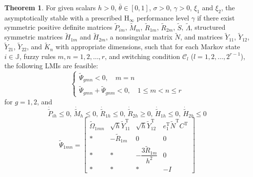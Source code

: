 \documentclass[preprint,review,fleqn,sort&compress,3p]{elsarticle}
\theoremstyle{definition} %
\theoremstyle{definition}%
\newtheorem{thm}{Theorem}[section]
\newif\ifreviewmarkup
\DeclareRobustCommand{\revdel}[1]{\ifreviewmarkup{\color{revisionred}\hypersetup{linkcolor=revisionred,citecolor=revisionred}#1}\fi}
\DeclareRobustCommand{\revadd}[1]{{\ifreviewmarkup\color{revisiongreen}\hypersetup{linkcolor=revisiongreen,citecolor=revisiongreen}\fi#1}}
\begin{document}
\begin{thm}\label{thm2}
\label{rev:M34} For given scalars $h > 0$, $\bar{\theta} \in [0,1]$, $\sigma > 0$, $\gamma > 0$, $\xi_1$ and $\xi_2$, the \revdel{closed-loop IT-2 fuzzy CPSs \eqref{eq:closed_loop} is} asymptotically stable with a prescribed $\mathrm{H}_\infty$ performance level $\gamma$ if there exist symmetric positive definite matrices $\tilde{P}_{im}$, $\tilde{M}_{m}$, $\tilde{R}_{1m}$, $\tilde{R}_{2m}$, $\tilde{S}$, $\tilde{\Lambda}$, structured symmetric matrices $\tilde{H}_{1m}$ and $\tilde{H}_{2m}$, a nonsingular matrix $\tilde{N}$, and matrices $\tilde{Y}_{11}$, $\tilde{Y}_{12}$, $\tilde{Y}_{21}$, $\tilde{Y}_{22}$, and $\widetilde{K}_n$ with appropriate dimensions, such that for each Markov state $i \in \mathbb{J}$, fuzzy rules $m,n = 1,2,\ldots,r$, and switching condition $\mathcal{C}_l$ ($l = 1,2,\ldots,2^{r-1}$), the following LMIs are feasible:
	\begin{equation}\label{shucr1_not}
		\begin{cases}
			\widetilde{\Psi}_{gmn} < 0 	,\quad  m=n  \\
			\widetilde{\Psi}_{gmn} + \widetilde{\Psi}_{gnm} < 0,\quad 1 \le m 	< n \le r
		\end{cases}
	\end{equation}
	for $g=1,2$, and
	\begin{equation}\label{dot_hat_small_0}
	\dot{\widetilde{P}}_{ih} \leq 0, \, 
	\dot{\widetilde{M}}_{h} \leq 0, \, 
	\dot{\widetilde{R}}_{1h} \leq 0, \, 
	\dot{\widetilde{R}}_{2h} \geq 0, \, 
	\dot{\widetilde{H}}_{1h} \leq 0, \, 
	\dot{\widetilde{H}}_{2h} \leq 0
	\end{equation}
\begin{equation}\label{LMI1_not}
\widetilde{\Psi}_{1mn} =
\begin{bmatrix}
	\widetilde{\Omega}_{1mn} & \sqrt{h} \widetilde{Y}_{11}^{\mathrm{T}} & \sqrt{h} \widetilde{Y}_{12}^{\mathrm{T}} & e_1^{\mathrm{T}} \widetilde{N}^{\mathrm{T}} {C}^{\mathrm{T}}\\[1.5ex]
	* & -\widetilde{R}_{1m} & 0 & 0 \\[1.5ex]
	* & * & -\dfrac{3\widetilde{R}_{1m}}{h^2} & 0\\[1.5ex]
	* & * & * & -I
\end{bmatrix}
\end{equation}


\end{thm}
\end{document}
